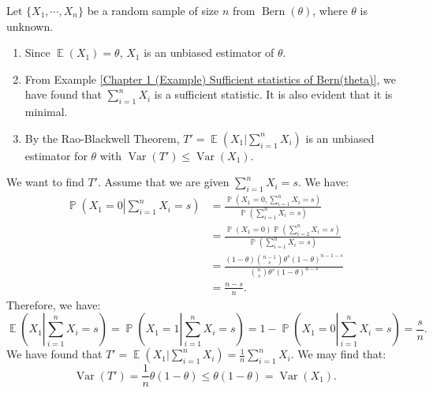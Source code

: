 \documentclass{huhtakm-template-book-v2}
\DeclareMathOperator{\prob}{\mathbb{P}}
\DeclareMathOperator{\E}{\mathbb{E}}
\DeclareMathOperator{\Var}{Var}
\DeclareMathOperator{\Bern}{Bern}
\begin{document}
    \begin{eg}
        Let $\{X_{1},\cdots,X_{n}\}$ be a random sample of size $n$ from $\Bern(\theta)$, where $\theta$ is unknown.
        \begin{enumerate}
            \item Since $\E(X_{1})=\theta$, $X_{1}$ is an unbiased estimator of $\theta$.
            \item From Example \ref{Chapter 1 (Example) Sufficient statistics of Bern(theta)}, we have found that $\sum_{i=1}^{n}X_{i}$ is a sufficient statistic. It is also evident that it is minimal.
            \item By the Rao-Blackwell Theorem, $T'=\E(X_{1}|\sum_{i=1}^{n}X_{i})$ is an unbiased estimator for $\theta$ with $\Var(T')\leq\Var(X_{1})$.
        \end{enumerate}
        We want to find $T'$. Assume that we are given $\sum_{i=1}^{n}X_{i}=s$. We have:
        \begin{align*}
            \prob\left(X_{1}=0\left|\sum_{i=1}^{n}X_{i}=s\right.\right)&=\frac{\prob\left(X_{1}=0,\sum_{i=1}^{n}X_{i}=s\right)}{\prob\left(\sum_{i=1}^{n}X_{i}=s\right)}\\
            &=\frac{\prob(X_{1}=0)\prob\left(\sum_{i=2}^{n}X_{i}=s\right)}{\prob\left(\sum_{i=1}^{n}X_{i}=s\right)}\\
            &=\frac{(1-\theta)\binom{n-1}{s}\theta^{s}(1-\theta)^{n-1-s}}{\binom{n}{s}\theta^{s}(1-\theta)^{n-s}}\\
            &=\frac{n-s}{n}.
        \end{align*}
        Therefore, we have:
        \begin{equation*}
            \E\left(X_{1}\left|\sum_{i=1}^{n}X_{i}=s\right.\right)=\prob\left(X_{1}=1\left|\sum_{i=1}^{n}X_{i}=s\right.\right)=1-\prob\left(X_{1}=0\left|\sum_{i=1}^{n}X_{i}=s\right.\right)=\frac{s}{n}.
        \end{equation*}
        We have found that $T'=\E\left(X_{1}|\sum_{i=1}^{n}X_{i}\right)=\frac{1}{n}\sum_{i=1}^{n}X_{i}$. We may find that:
        \begin{equation*}
            \Var(T')=\frac{1}{n}\theta(1-\theta)\leq\theta(1-\theta)=\Var(X_{1}).
        \end{equation*}
    \end{eg}
    \newpage
    
\end{document}
